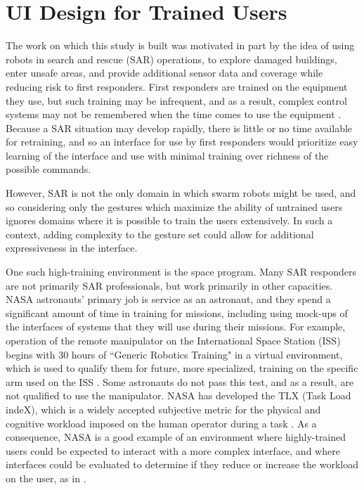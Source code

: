 \chapter{UI Design for Trained Users}
\thispagestyle{fancy}

The work on which this study is built was motivated in part by the idea of using robots in search and rescue (SAR) operations, to explore damaged buildings, enter unsafe areas, and provide additional sensor data and coverage while reducing risk to first responders.
First responders are trained on the equipment they use, but such training may be infrequent, and as a result, complex control systems may not be remembered when the time comes to use the equipment \citep{micire2010multi}. 
Because a SAR situation may develop rapidly, there is little or no time available for retraining, and so an interface for use by first responders would prioritize easy learning of the interface and use with minimal training over richness of the possible commands.  

However, SAR is not the only domain in which swarm robots might be used, and so considering only the gestures which maximize the ability of untrained users ignores domains where it is possible to train the users extensively. 
In such a context, adding complexity to the gesture set could allow for additional expressiveness in the interface.

One such high-training environment is the space program. 
Many SAR responders are not primarily SAR professionals, but work primarily in other capacities. 
NASA astronauts' primary job is service as an astronaut, and they spend a significant amount of time in training for missions, including using mock-ups of the interfaces of systems that they will use during their missions. 
For example, operation of the remote manipulator on the International Space Station (ISS) begins with 30 hours of ``Generic Robotics Training" in a virtual environment, which is used to qualify them for future, more specialized, training on the specific arm used on the ISS \citep{liu2013predicting}. 
Some astronauts do not pass this test, and as a result, are not qualified to use the manipulator. 
NASA has developed the TLX (Task Load indeX), which is a widely accepted subjective metric for the physical and cognitive workload imposed on the human operator during a task \citep{hart2006nasa}.
As a consequence, NASA is a good example of an environment where highly-trained users could be expected to interact with a more complex interface, and where interfaces could be evaluated to determine if they reduce or increase the workload on the user, as in \citep{fong2006human}.


